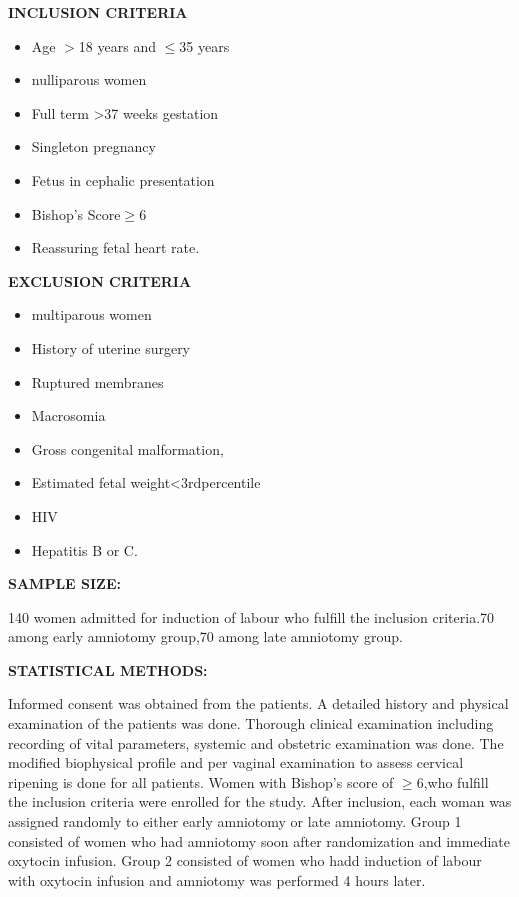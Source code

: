 \documentclass[14pt]{extarticle}
\begin{document}
\textbf{\large INCLUSION CRITERIA}
\begin{itemize}
    \item Age $>$18 years and $\leq$35 years
    \item nulliparous women
    \item Full term >37 weeks gestation
    \item Singleton pregnancy
    \item Fetus in cephalic presentation
    \item Bishop’s Score$\geq$6
    \item Reassuring fetal heart rate.
\end{itemize}

\textbf{\large EXCLUSION CRITERIA}
\begin{itemize}
    \item multiparous women
    \item History of uterine surgery
    \item Ruptured membranes
    \item Macrosomia
    \item Gross congenital malformation,
    \item Estimated fetal weight<3rdpercentile
    \item HIV
    \item Hepatitis B or C.
\end{itemize}

\textbf{\large SAMPLE SIZE:}

140 women admitted for induction of labour who fulfill the inclusion criteria.70 among early amniotomy group,70 among late amniotomy group.

\textbf{\large STATISTICAL METHODS:}

Informed consent was obtained from the patients. A detailed history and physical examination of the patients was done. Thorough clinical examination including recording of vital parameters, systemic and obstetric examination was done. The modified biophysical profile and per vaginal examination to assess  cervical ripening is done for all patients. Women with Bishop’s score of $\geq$6,who fulfill the inclusion criteria were enrolled for the study. After inclusion, each woman was assigned randomly to either early amniotomy or late amniotomy. Group 1 consisted of women who had amniotomy soon after randomization and immediate oxytocin infusion. Group 2 consisted of women who hadd induction of labour with oxytocin infusion and amniotomy was performed 4 hours later.
\end{document}
